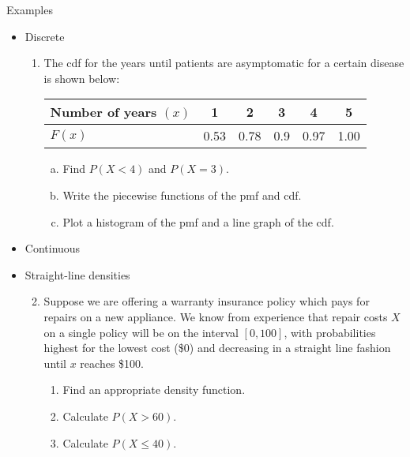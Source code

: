 \documentclass{article}
\begin{document}
Examples\bigskip
\begin{itemize}
    \item Discrete
    \begin{enumerate}
        \item The cdf for the years until patients are asymptomatic for a certain disease is shown below:\smallskip
        \begin{center}
            \begin{tabular}{| l || c | c | c | c | c |}
            \hline
            Number of years $(x)$ & 1 & 2 & 3 & 4 & 5\\
            \hline
            $F(x)$ & 0.53 & 0.78 & 0.9 & 0.97 & 1.00\\
            \hline
            \end{tabular}
        \end{center}\bigskip
        \begin{enumerate}[a)]
            \item Find $P(X < 4)$ and $P(X = 3)$.\vspace{40pt}
            \item Write the piecewise functions of the pmf and cdf.\vspace{140pt}
            \item Plot a histogram of the pmf and a line graph of the cdf.\vspace{150pt}
        \end{enumerate}
    \end{enumerate}\newpage
    \item Continuous
    \item[] Straight-line densities
    \begin{enumerate}\setcounter{enumi}{1}
        \item Suppose we are offering a warranty insurance policy which pays for repairs on a new appliance. We know from experience that repair costs $X$ on a single policy will be on the interval $[0, 100]$, with probabilities highest for the lowest cost (\$0) and decreasing in a straight line fashion until $x$ reaches \$100.
        \begin{enumerate}
            \item Find an appropriate density function.\vspace{140pt}
            \item Calculate $P(X > 60)$.\vspace{130pt}
            \item Calculate $P(X \le 40)$.\vfill
        \end{enumerate}

\end{enumerate}
\end{itemize}
\end{document}
